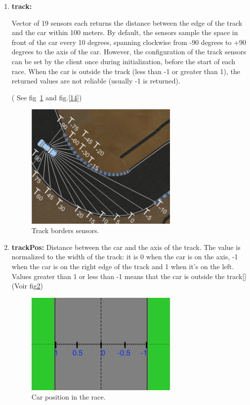 \documentclass{llncs}
\begin{document}
\begin{enumerate}
	
	\item \textbf{track:}   
	
	Vector of 19 sensors each returns the distance between the edge of the track and the car within 100 meters. By default, the sensors sample the space in front of the car every 10 degrees, spanning clockwise from -90 degrees to +90 degrees to the axis of the car. However, the configuration of the track sensors can be set by the client once during initialization, before the start of each race. When the car is outside the track (less than -1 or greater than 1), the returned values are not reliable (usually -1 is returned).
	
	( See fig~\ref{tab16} and fig.\ref{14})
	\begin{figure}[h!]
		\centering
		\includegraphics[width=0.7\textwidth]{fig/Track.PNG}
		
		\begin{minipage}{10cm}
			\centering
			\caption{\footnotesize Track borders sensors.}
			\label{tab16}
		\end{minipage} 
		
		
	\end{figure}
	\newpage
	\item \textbf{trackPos:} 		
	Distance between the car and the axis of the track. The value is normalized to the width of the track: it is 0 when the car is on the axis, -1 when the car is on the right edge of the track and 1 when it's on the left. Values greater than 1 or less than -1 means that the car is outside the track[\cite{torcs2}](Voir fig\ref{tab17})
	\begin{figure}[h!]
		\centering
		\includegraphics[width=0.7\textwidth]{fig/position.PNG}
		\begin{minipage}{10cm}
			\centering
			\caption{\footnotesize Car position in the race.}
			\label{tab17}
		\end{minipage} 


\end{figure}
\end{enumerate}
\end{document}
